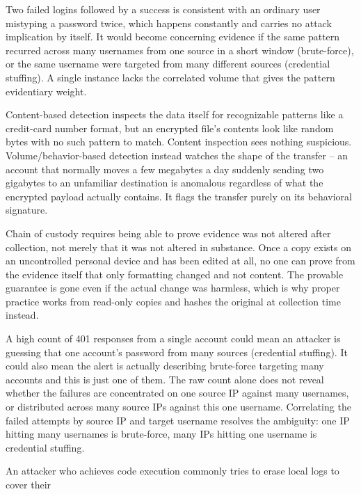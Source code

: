 \begin{answerkey}
\item Two failed logins followed by a success is consistent with an ordinary user mistyping a
password twice, which happens constantly and carries no attack implication by itself. It would
become concerning evidence if the same pattern recurred across many usernames from one source in a
short window (brute-force), or the same username were targeted from many different sources
(credential stuffing). A single instance lacks the correlated volume that gives the pattern
evidentiary weight.
\item Content-based detection inspects the data itself for recognizable patterns like a credit-card
number format, but an encrypted file's contents look like random bytes with no such pattern to
match. Content inspection sees nothing suspicious. Volume/behavior-based detection instead watches
the shape of the transfer -- an account that normally moves a few megabytes a day suddenly sending
two gigabytes to an unfamiliar destination is anomalous regardless of what the encrypted payload
actually contains. It flags the transfer purely on its behavioral signature.
\item Chain of custody requires being able to prove evidence was not altered after collection, not
merely that it was not altered in substance. Once a copy exists on an uncontrolled personal device
and has been edited at all, no one can prove from the evidence itself that only formatting changed
and not content. The provable guarantee is gone even if the actual change was harmless, which is why
proper practice works from read-only copies and hashes the original at collection time instead.
\item A high count of 401 responses from a single account could mean an attacker is guessing that
one account's password from many sources (credential stuffing). It could also mean the alert is
actually describing brute-force targeting many accounts and this is just one of them. The raw count
alone does not reveal whether the failures are concentrated on one source IP against many usernames,
or distributed across many source IPs against this one username. Correlating the failed attempts by
source IP and target username resolves the ambiguity: one IP hitting many usernames is brute-force,
many IPs hitting one username is credential stuffing.
\item An attacker who achieves code execution commonly tries to erase local logs to cover their

\end{answerkey}
